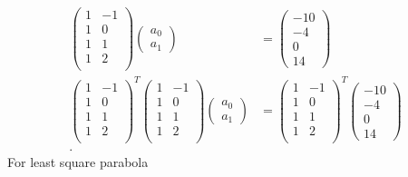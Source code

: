 \documentclass[5pt, a4paper]{article}
\begin{document}
\begin{align*}
    \begin{pmatrix} 
        1 & -1 \\
        1 & 0 \\
        1 & 1 \\
        1 & 2 \\
    \end{pmatrix} 
    \begin{pmatrix} a_0 \\ a_1 \end{pmatrix} 
    &= \begin{pmatrix} -10 \\ -4 \\ 0 \\ 14 \end{pmatrix}  \\
    \begin{pmatrix} 
        1 & -1 \\
        1 & 0 \\
        1 & 1 \\
        1 & 2 \\
    \end{pmatrix}^T
    \begin{pmatrix} 
        1 & -1 \\
        1 & 0 \\
        1 & 1 \\
        1 & 2 \\
    \end{pmatrix} 
    \begin{pmatrix} a_0 \\ a_1 \end{pmatrix} 
    &= 
    \begin{pmatrix} 
        1 & -1 \\
        1 & 0 \\
        1 & 1 \\
        1 & 2 \\
    \end{pmatrix}^T
    \begin{pmatrix} -10 \\ -4 \\ 0 \\ 14 \end{pmatrix} \\
.\end{align*}
For least square parabola
\end{document}
